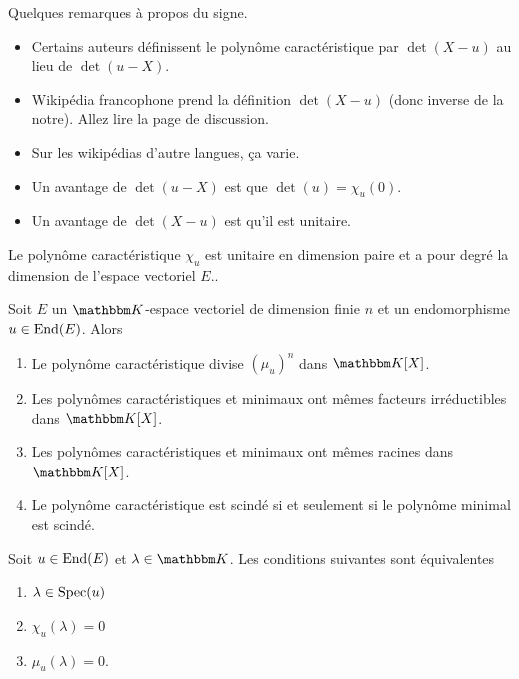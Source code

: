 \begin{remark}
    Quelques remarques à propos du signe.
    \begin{itemize}
        \item
            Certains auteurs définissent le polynôme caractéristique par \( \det(X-u)\) au lieu de \( \det(u-X)\).
        \item
            Wikipédia francophone prend la définition \( \det(X-u)\) (donc inverse de la notre). Allez lire la page de discussion.
        \item
            Sur les wikipédias d'autre langues, ça varie.
        \item
            Un avantage de \( \det(u-X)\) est que \( \det(u)=\chi_u(0)\).
        \item
            Un avantage de \( \det(X-u)\) est qu'il est unitaire.
    \end{itemize}
\end{remark}

\begin{lemma}       \label{LemooWCZMooZqyaHd}
    Le polynôme caractéristique \( \chi_u\) est unitaire en dimension paire et a pour degré la dimension de l'espace vectoriel \( E\)..
\end{lemma}

\begin{theorem}     \label{ThoNhbrUL}
    Soit \( E\) un \(\eK\)-espace vectoriel de dimension finie \( n\) et un endomorphisme \( u\in\operatorname{End}(E)\). Alors
    \begin{enumerate}
        \item
            Le polynôme caractéristique divise \( (\mu_u)^n\) dans \(\eK[X]\).
        \item
            Les polynômes caractéristiques et minimaux ont mêmes facteurs irréductibles dans \(\eK[X]\).
        \item
            Les polynômes caractéristiques et minimaux ont mêmes racines dans \(\eK[X]\).
        \item
            Le polynôme caractéristique est scindé si et seulement si le polynôme minimal est scindé.
    \end{enumerate}
\end{theorem}

\begin{theorem} \label{ThoWDGooQUGSTL}
    Soit \( u\in\operatorname{End}(E)\) et \( \lambda\in\eK\). Les conditions suivantes sont équivalentes
    \begin{enumerate}
        \item\label{ItemeXHXhHi}
            \( \lambda\in\operatorname{Spec}(u)\)
        \item\label{ItemeXHXhHii}
            \( \chi_u(\lambda)=0\)
        \item\label{ItemeXHXhHiii}
            \( \mu_u(\lambda)=0\).
    \end{enumerate}
\end{theorem}

